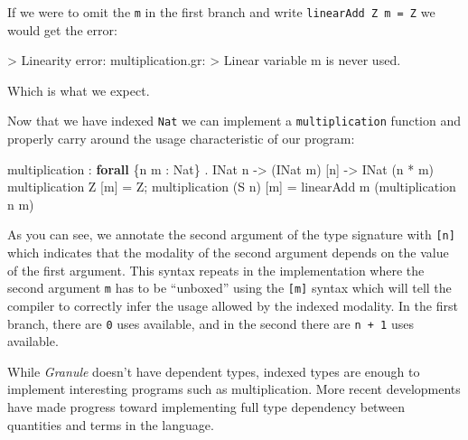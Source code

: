 \documentclass[
]{article}
\newenvironment{Shaded}{}{}
\newcommand{\DataTypeTok}[1]{\textcolor[rgb]{0.56,0.13,0.00}{#1}}
\newcommand{\FunctionTok}[1]{\textcolor[rgb]{0.02,0.16,0.49}{#1}}
\newcommand{\KeywordTok}[1]{\textcolor[rgb]{0.00,0.44,0.13}{\textbf{#1}}}
\newcommand{\NormalTok}[1]{#1}
\newcommand{\OperatorTok}[1]{\textcolor[rgb]{0.40,0.40,0.40}{#1}}
\newcommand{\OtherTok}[1]{\textcolor[rgb]{0.00,0.44,0.13}{#1}}
\begin{document}
If we were to omit the \texttt{m} in the first branch and write
\texttt{linearAdd\ Z\ m\ =\ Z} we would get the error:

\begin{Shaded}
\begin{Highlighting}[]
\OperatorTok{\textgreater{}} \DataTypeTok{Linearity} \FunctionTok{error}\OperatorTok{:}\NormalTok{ multiplication}\OperatorTok{.}\NormalTok{gr}\OperatorTok{:}
\OperatorTok{\textgreater{}} \DataTypeTok{Linear}\NormalTok{ variable }\OtherTok{\textasciigrave{}m\textasciigrave{}}\NormalTok{ is never used}\OperatorTok{.}
\end{Highlighting}
\end{Shaded}

Which is what we expect.

Now that we have indexed \texttt{Nat} we can implement a
\texttt{multiplication} function and properly carry around the usage
characteristic of our program:

\begin{Shaded}
\begin{Highlighting}[]
\NormalTok{multiplication }\OperatorTok{:} \KeywordTok{forall}\NormalTok{ \{n m }\OperatorTok{:} \DataTypeTok{Nat}\NormalTok{\} }\OperatorTok{.} \DataTypeTok{INat}\NormalTok{ n }\OtherTok{{-}\textgreater{}}\NormalTok{ (}\DataTypeTok{INat}\NormalTok{ m) [n] }\OtherTok{{-}\textgreater{}} \DataTypeTok{INat}\NormalTok{ (n }\OperatorTok{*}\NormalTok{ m)}
\NormalTok{multiplication }\DataTypeTok{Z}\NormalTok{ [m] }\OtherTok{=} \DataTypeTok{Z}\NormalTok{;}
\NormalTok{multiplication (}\DataTypeTok{S}\NormalTok{ n) [m] }\OtherTok{=}\NormalTok{ linearAdd m (multiplication n m)}
\end{Highlighting}
\end{Shaded}

As you can see, we annotate the second argument of the type signature
with \texttt{{[}n{]}} which indicates that the modality of the second
argument depends on the value of the first argument. This syntax repeats
in the implementation where the second argument \texttt{m} has to be
``unboxed'' using the \texttt{{[}m{]}} syntax which will tell the
compiler to correctly infer the usage allowed by the indexed modality.
In the first branch, there are \texttt{0} uses available, and in the
second there are \texttt{n\ +\ 1} uses available.

While \emph{Granule} doesn't have dependent types, indexed types are
enough to implement interesting programs such as multiplication. More
recent developments have made progress toward implementing full type
dependency between quantities and terms in the
language\cite{dependent_graded}.
\end{document}
